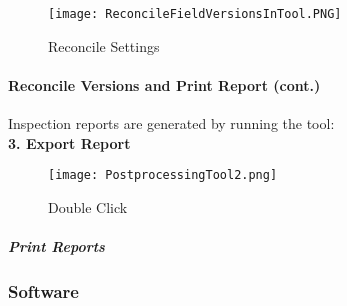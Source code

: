 \vspace{.5in}





\vspace{1in}

\begin{wrapfigure}{r}{0.5\textwidth}

\centering
    \texttt{[image: ReconcileFieldVersionsInTool.PNG]}
\caption{Reconcile Settings}



\end{wrapfigure}



\clearpage











\paragraph*{Reconcile Versions and Print Report {\footnotesize (cont.)}}

\vspace{.5in}

Inspection reports are generated by running the tool:\\

\textbf{3. Export Report}

\vspace{1in}

\begin{wrapfigure}{r}{0.6\textwidth}

\centering
    \texttt{[image: PostprocessingTool2.png]}
\caption{Double Click}
\end{wrapfigure}
\subparagraph{Print Reports}
\vspace{2in}


\clearpage














\subsubsection{Software}
